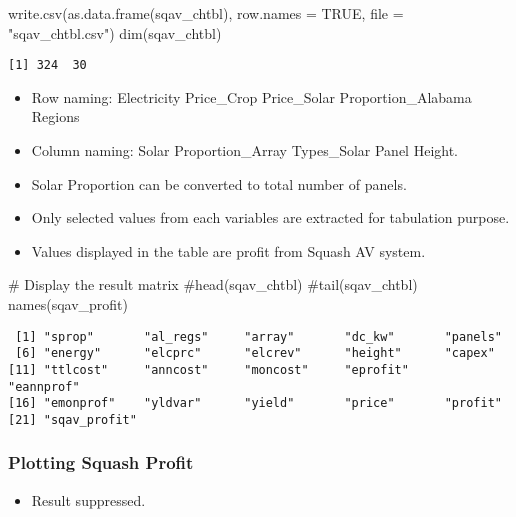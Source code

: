 \documentclass[
  letterpaper,
  DIV=11,
  numbers=noendperiod]{scrartcl}
\newenvironment{Shaded}{\begin{snugshade}}{\end{snugshade}}
\newcommand{\AttributeTok}[1]{\textcolor[rgb]{0.40,0.45,0.13}{#1}}
\newcommand{\CommentTok}[1]{\textcolor[rgb]{0.37,0.37,0.37}{#1}}
\newcommand{\ConstantTok}[1]{\textcolor[rgb]{0.56,0.35,0.01}{#1}}
\newcommand{\FunctionTok}[1]{\textcolor[rgb]{0.28,0.35,0.67}{#1}}
\newcommand{\NormalTok}[1]{\textcolor[rgb]{0.00,0.23,0.31}{#1}}
\newcommand{\StringTok}[1]{\textcolor[rgb]{0.13,0.47,0.30}{#1}}
\providecommand{\tightlist}{%
  \setlength{\itemsep}{0pt}\setlength{\parskip}{0pt}}\usepackage{longtable,booktabs,array}
\begin{document}
\begin{Shaded}
\begin{Highlighting}[]
\FunctionTok{write.csv}\NormalTok{(}\FunctionTok{as.data.frame}\NormalTok{(sqav\_chtbl),}
          \AttributeTok{row.names =} \ConstantTok{TRUE}\NormalTok{,}
          \AttributeTok{file =} \StringTok{"sqav\_chtbl.csv"}\NormalTok{)}
\FunctionTok{dim}\NormalTok{(sqav\_chtbl)}
\end{Highlighting}
\end{Shaded}

\begin{verbatim}
[1] 324  30
\end{verbatim}

\begin{itemize}
\item
  Row naming: Electricity Price\_Crop Price\_Solar Proportion\_Alabama
  Regions
\item
  Column naming: Solar Proportion\_Array Types\_Solar Panel Height.
\item
  Solar Proportion can be converted to total number of panels.
\item
  Only selected values from each variables are extracted for tabulation
  purpose.
\item
  Values displayed in the table are profit from Squash AV system.
\end{itemize}

\begin{Shaded}
\begin{Highlighting}[]
\CommentTok{\# Display the result matrix}
\CommentTok{\#head(sqav\_chtbl)}
\CommentTok{\#tail(sqav\_chtbl)}
\FunctionTok{names}\NormalTok{(sqav\_profit)}
\end{Highlighting}
\end{Shaded}

\begin{verbatim}
 [1] "sprop"       "al_regs"     "array"       "dc_kw"       "panels"     
 [6] "energy"      "elcprc"      "elcrev"      "height"      "capex"      
[11] "ttlcost"     "anncost"     "moncost"     "eprofit"     "eannprof"   
[16] "emonprof"    "yldvar"      "yield"       "price"       "profit"     
[21] "sqav_profit"
\end{verbatim}

\subsubsection{Plotting Squash Profit}\label{plotting-squash-profit}

\begin{itemize}
\tightlist
\item
  Result suppressed.
\end{itemize}
\end{document}
